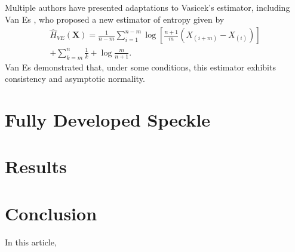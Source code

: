 \documentclass[conference]{IEEEtran}
\begin{document}
Multiple authors have presented  adaptations to Vasicek's estimator, including Van Es \cite{Bert1992}, who proposed a new estimator of entropy given by
\begin{multline}
	\widehat{H}_{VE}(\bm{X})=\frac{1}{n-m}\sum_{i=1}^{n-m}\log\left[\frac{n+1}{m}\left(X_{(i+m)}-X_{(i)}\right)\right]\\
	+\sum_{k=m}^n\frac{1}{k}+\log\frac{m}{n+1}.
\end{multline}
Van Es demonstrated that, under some conditions, this estimator exhibits consistency and asymptotic normality.


\section{Fully Developed Speckle}

\section{Results}

\section{Conclusion}\label{sec_09}

In this article, 


%


\end{document}
